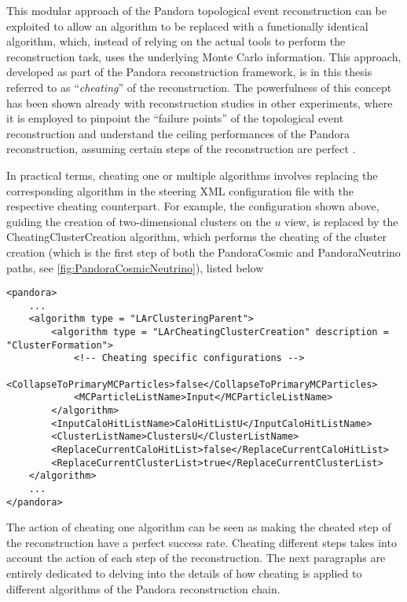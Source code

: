 This modular approach of the Pandora topological event reconstruction can be exploited to allow an algorithm to be replaced with a functionally identical algorithm, which, instead of relying on the actual tools to perform the reconstruction task, uses the underlying Monte Carlo information. This approach, developed as part of the Pandora reconstruction framework, is in this thesis referred to as ``\emph{cheating}'' of the reconstruction. The powerfulness of this concept has been shown already with reconstruction studies in other experiments, where it is employed to pinpoint the ``failure points'' of the topological event reconstruction and understand the ceiling performances of the Pandora reconstruction, assuming certain steps of the reconstruction are perfect \cite{Mawby:2023nws, Mawby:2025_FCCee, Nguyen:2023_cheatingPandora}. 

In practical terms, cheating one or multiple algorithms involves replacing the corresponding algorithm in the steering XML configuration file with the respective cheating counterpart. For example, the configuration shown above, guiding the creation of two-dimensional clusters on the $u$ view, is replaced by the CheatingClusterCreation algorithm, which performs the cheating of the cluster creation (which is the first step of both the PandoraCosmic and PandoraNeutrino paths, see \autoref{fig:PandoraCosmicNeutrino}), listed below 

\begin{lstlisting}[style=xmlstyle]
<pandora>
    ...
    <algorithm type = "LArClusteringParent">
        <algorithm type = "LArCheatingClusterCreation" description = "ClusterFormation">
            <!-- Cheating specific configurations -->
            <CollapseToPrimaryMCParticles>false</CollapseToPrimaryMCParticles>
            <MCParticleListName>Input</MCParticleListName>
        </algorithm>
        <InputCaloHitListName>CaloHitListU</InputCaloHitListName>
        <ClusterListName>ClustersU</ClusterListName>
        <ReplaceCurrentCaloHitList>false</ReplaceCurrentCaloHitList>
        <ReplaceCurrentClusterList>true</ReplaceCurrentClusterList>
    </algorithm>
    ...
</pandora>
\end{lstlisting}

The action of cheating one algorithm can be seen as making the cheated step of the reconstruction have a perfect success rate. Cheating different steps takes into account the action of each step of the reconstruction. The next paragraphs are entirely dedicated to delving into the details of how cheating is applied to different algorithms of the Pandora reconstruction chain. 

